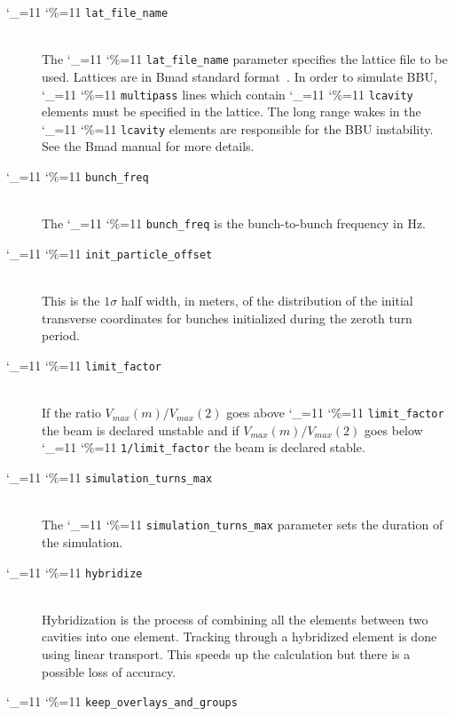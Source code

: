\documentclass[11pt]{article}
\newcommand\ttcmd{\begingroup\catcode`\_=11 \catcode`\%=11 \dottcmd}
\newcommand\dottcmd[1]{\texttt{#1}\endgroup}
\newcommand{\vn}{\ttcmd}
\newcommand{\Newline}{\hfil \\}
\begin{document}
  \begin{description}
  \item[\vn{lat_file_name}] \Newline
The \vn{lat_file_name} parameter specifies the lattice file to be
used.  Lattices are in Bmad standard format~\cite{ref:bmad}. In order
to simulate BBU, \vn{multipass} lines which contain \vn{lcavity}
elements must be specified in the lattice. The long range wakes in the
\vn{lcavity} elements are responsible for the BBU instability. See
the Bmad manual for more details.
  \item[\vn{bunch_freq}] \Newline
The \vn{bunch_freq} is the bunch-to-bunch frequency in Hz.
  \item[\vn{init_particle_offset}] \Newline
This is the $1\sigma$ half width, in meters, of the distribution of
the initial transverse coordinates for bunches initialized during the
zeroth turn period.
  \item[\vn{limit_factor}] \Newline
If the ratio $V_{max}(m)/V_{max}(2)$ goes above \vn{limit_factor} the
beam is declared unstable and if $V_{max}(m)/V_{max}(2)$ goes below
\vn{1/limit_factor} the beam is declared stable.
  \item[\vn{simulation_turns_max}] \Newline
The \vn{simulation_turns_max} parameter sets the duration of the simulation.
  \item[\vn{hybridize}] \Newline
Hybridization is the process of combining all the elements between
two cavities into one element. Tracking through a hybridized element
is done using linear transport. This speeds up the calculation but
there is a possible loss of accuracy.
  \item[\vn{keep_overlays_and_groups}] \Newline


\end{description}
\end{document}
